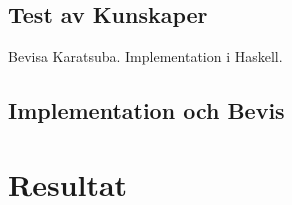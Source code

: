 \documentclass[a4paper]{article}
\begin{document}
\subsection{Test av Kunskaper}
Bevisa Karatsuba. Implementation i Haskell.

\subsection{Implementation och Bevis}

\section{Resultat}



\nocite{*}
\end{document}
